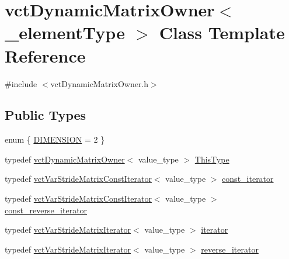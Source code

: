 \hypertarget{classvct_dynamic_matrix_owner}{}\section{vct\+Dynamic\+Matrix\+Owner$<$ \+\_\+element\+Type $>$ Class Template Reference}
\label{classvct_dynamic_matrix_owner}


{\ttfamily \#include $<$vct\+Dynamic\+Matrix\+Owner.\+h$>$}

\subsection*{Public Types}
\begin{DoxyCompactItemize}
\item 
enum \{ \hyperlink{classvct_dynamic_matrix_owner_ab539c6209377e71938f3be5a0f73aa90a3cbd1d8cbd91b8e603c01551869fb839}{D\+I\+M\+E\+N\+S\+I\+O\+N} = 2
 \}
\item 
typedef \hyperlink{classvct_dynamic_matrix_owner}{vct\+Dynamic\+Matrix\+Owner}$<$ value\+\_\+type $>$ \hyperlink{classvct_dynamic_matrix_owner_a6e693f28f71b3e0b7f5c62d334f99779}{This\+Type}
\item 
typedef \hyperlink{classvct_var_stride_matrix_const_iterator}{vct\+Var\+Stride\+Matrix\+Const\+Iterator}$<$ value\+\_\+type $>$ \hyperlink{classvct_dynamic_matrix_owner_ac83fab5858a222a2debcf2059c9f06e2}{const\+\_\+iterator}
\item 
typedef \hyperlink{classvct_var_stride_matrix_const_iterator}{vct\+Var\+Stride\+Matrix\+Const\+Iterator}$<$ value\+\_\+type $>$ \hyperlink{classvct_dynamic_matrix_owner_a3f5a649a5285f9909e4628151d9cdac1}{const\+\_\+reverse\+\_\+iterator}
\item 
typedef \hyperlink{classvct_var_stride_matrix_iterator}{vct\+Var\+Stride\+Matrix\+Iterator}$<$ value\+\_\+type $>$ \hyperlink{classvct_dynamic_matrix_owner_aa723836eb06a7ae230e80ec85a44e059}{iterator}
\item 
typedef \hyperlink{classvct_var_stride_matrix_iterator}{vct\+Var\+Stride\+Matrix\+Iterator}$<$ value\+\_\+type $>$ \hyperlink{classvct_dynamic_matrix_owner_afa1149b71fe5f3151ee890e65ea7e81b}{reverse\+\_\+iterator}
\end{DoxyCompactItemize}
